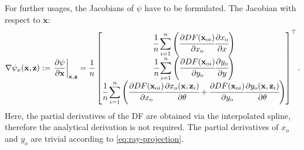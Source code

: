 For further usages, the Jacobians of $\psi$ have to be formulated.
The Jacobian with respect to $\mathbf{x}$:
\begin{equation}\label{eq:measmodel-jacobi-x}
    \nabla\psi_x(\mathbf{x},\mathbf{z}) := \left.\frac{\partial\psi}{\partial \mathbf{x}}\right\vert_{\mathbf{x},\mathbf{z}} =
    \frac{1}{n}
    \begin{bmatrix}
        \cfrac{1}{n}\displaystyle\sum\limits_{i=1}^{n}\left(\cfrac{\partial DF(\mathbf{x}_{\text{o}i})}{\partial x_{\text{o}}}\cfrac{\partial x_{\text{o}}}{\partial x}\right) \\
        \cfrac{1}{n}\displaystyle\sum\limits_{i=1}^{n}\left(\cfrac{\partial DF(\mathbf{x}_{\text{o}i})}{\partial y_{\text{o}}}\cfrac{\partial y_{\text{o}}}{\partial y}\right) \\
        \cfrac{1}{n}\displaystyle\sum\limits_{i=1}^{n}\left(\cfrac{\partial DF(\mathbf{x}_{\text{o}i})}{\partial x_{\text{o}}}\cfrac{\partial x_{\text{o}}(\mathbf{x},\mathbf{z}_i)}{\partial \theta}
        + \cfrac{\partial DF(\mathbf{x}_{\text{o}i})}{\partial y_{\text{o}}}\cfrac{\partial y_{\text{o}}(\mathbf{x},\mathbf{z}_i)}{\partial \theta}\right)                     \\
    \end{bmatrix}^{\top}.
\end{equation}
Here, the partial derivatives of the DF are obtained via the interpolated spline, therefore the analytical
derivation is not required.
The partial derivatives of $x_o$ and $y_o$ are trivial according to \eqref{eq:ray-projection}.

